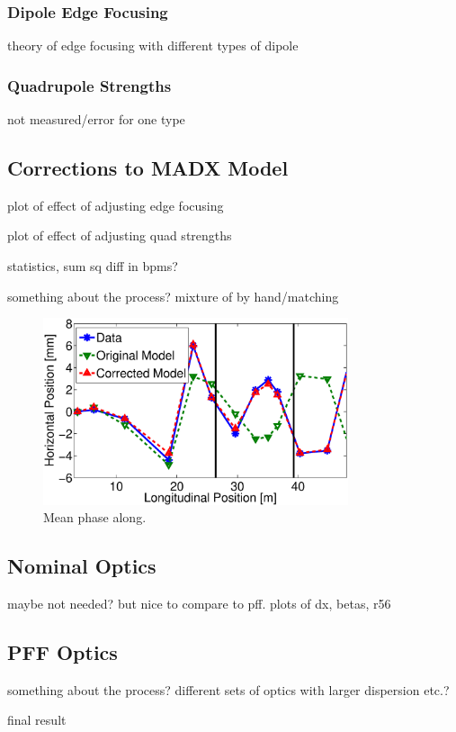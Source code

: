 \subsubsection{Dipole Edge Focusing}
\label{sss:edgeFocusing}

theory of edge focusing with different types of dipole

\subsubsection{Quadrupole Strengths}
\label{sss:quadStrengths}

not measured/error for one type

\subsection{Corrections to MADX Model}
\label{ss:modelCorrections}

plot of effect of adjusting edge focusing

plot of effect of adjusting quad strengths

statistics, sum sq diff in bpms?

something about the process? mixture of by hand/matching

\begin{figure}
  \centering
  \includegraphics[width=0.8\textwidth]{Figures/optics/opticsCorrVsOrig}
  \caption{Mean phase along.}
  \label{f:opticsCorrVsOrig}
\end{figure}


\subsection{Nominal Optics}
\label{ss:nominalMatched}

maybe not needed? but nice to compare to pff. plots of dx, betas, r56

\subsection{PFF Optics}
\label{ss:pffMatched}

something about the process? different sets of optics with larger dispersion etc.?

final result
